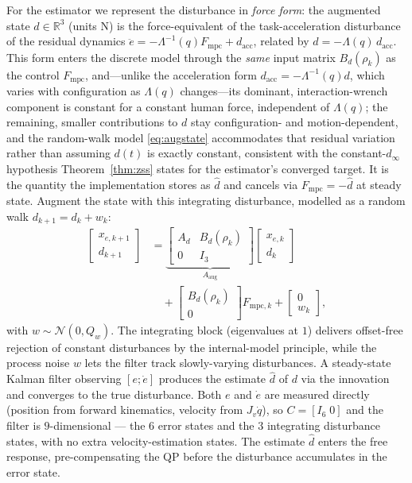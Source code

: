 \documentclass[journal]{IEEEtran}
\newcommand{\Laminv}{\Lambda^{-1}(q)}
\newcommand{\Fmpc}{F_{\text{mpc}}}
\newcommand{\Fmpck}[1]{F_{\text{mpc},#1}}
\newcommand{\dhat}{\hat{d}}
\begin{document}
For the estimator we represent the disturbance in \emph{force form}: the
augmented state $d\in\mathbb{R}^3$ (units N) is the force-equivalent of the
task-acceleration disturbance of the residual dynamics
$\ddot{e}=-\Laminv\Fmpc+d_{\text{acc}}$, related by $d=-\Lambda(q)\,d_{\text{acc}}$.
This form enters the discrete model through the \emph{same} input matrix
$B_d(\rho_k)$ as the control $\Fmpc$, and---unlike the acceleration form
$d_{\text{acc}}=-\Lambda^{-1}(q)d$, which varies with configuration as
$\Lambda(q)$ changes---its dominant, interaction-wrench component is constant
for a constant human force, independent of $\Lambda(q)$; the remaining,
smaller contributions to $d$ stay configuration- and motion-dependent, and
the random-walk model \eqref{eq:augstate} accommodates that residual
variation rather than assuming $d(t)$ is exactly constant, consistent with
the constant-$d_\infty$ hypothesis Theorem~\ref{thm:zss} states for the
estimator's converged target. It is the quantity
the implementation stores as $\dhat$ and cancels via $\Fmpc=-\dhat$ at steady
state. Augment the state with this integrating disturbance, modelled as a
random walk $d_{k+1}=d_k+w_k$:
\begin{equation}\label{eq:augstate}
\begin{aligned}
  \begin{bmatrix}x_{e,k+1}\\d_{k+1}\end{bmatrix}
  &= \underbrace{\begin{bmatrix}A_d&B_d(\rho_k)\\0&I_3\end{bmatrix}}_{A_{\text{aug}}}
    \begin{bmatrix}x_{e,k}\\d_k\end{bmatrix}\\[2pt]
  &\quad + \begin{bmatrix}B_d(\rho_k)\\0\end{bmatrix}\Fmpck{k}
  + \begin{bmatrix}0\\w_k\end{bmatrix},
\end{aligned}
\end{equation}
with $w\sim\mathcal{N}(0,Q_w)$.
The integrating block (eigenvalues at $1$) delivers offset-free
rejection of constant disturbances by the internal-model principle,
while the process noise $w$ lets the filter track slowly-varying
disturbances. A steady-state Kalman filter observing $[e;\dot{e}]$
produces the estimate $\dhat$ of $d$ via the innovation and converges to
the true disturbance. Both $e$ and $\dot e$ are
measured directly (position from forward kinematics, velocity from
$J_v\dot q$), so $C=[I_6\;0]$ and the filter is $9$-dimensional --- the
$6$ error states and the $3$ integrating disturbance states, with no
extra velocity-estimation states. The estimate $\dhat$
enters the free response, pre-compensating the QP before the disturbance
accumulates in the error state.
\end{document}
